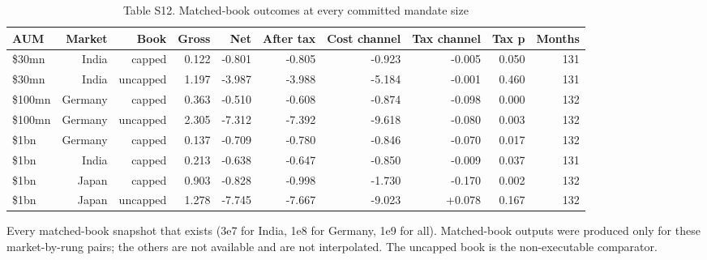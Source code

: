 \begin{table}[t]
\centering
\small
\caption{Table S12. Matched-book outcomes at every committed mandate size}
\label{tab:s12}
\begin{tabular}{lrrrrrrrrr}
\toprule
AUM & Market & Book & Gross & Net & After tax & Cost channel & Tax channel & Tax p & Months \\
\midrule
\$30mn & India & capped & 0.122 & -0.801 & -0.805 & -0.923 & -0.005 & 0.050 & 131 \\
\$30mn & India & uncapped & 1.197 & -3.987 & -3.988 & -5.184 & -0.001 & 0.460 & 131 \\
\$100mn & Germany & capped & 0.363 & -0.510 & -0.608 & -0.874 & -0.098 & 0.000 & 132 \\
\$100mn & Germany & uncapped & 2.305 & -7.312 & -7.392 & -9.618 & -0.080 & 0.003 & 132 \\
\$1bn & Germany & capped & 0.137 & -0.709 & -0.780 & -0.846 & -0.070 & 0.017 & 132 \\
\$1bn & India & capped & 0.213 & -0.638 & -0.647 & -0.850 & -0.009 & 0.037 & 131 \\
\$1bn & Japan & capped & 0.903 & -0.828 & -0.998 & -1.730 & -0.170 & 0.002 & 132 \\
\$1bn & Japan & uncapped & 1.278 & -7.745 & -7.667 & -9.023 & +0.078 & 0.167 & 132 \\
\bottomrule
\end{tabular}
\par\vspace{2pt}
\parbox{\textwidth}{\footnotesize Every matched-book snapshot that exists (3e7 for India, 1e8 for Germany, 1e9 for all). Matched-book outputs were produced only for these market-by-rung pairs; the others are not available and are not interpolated. The uncapped book is the non-executable comparator.}
\end{table}
